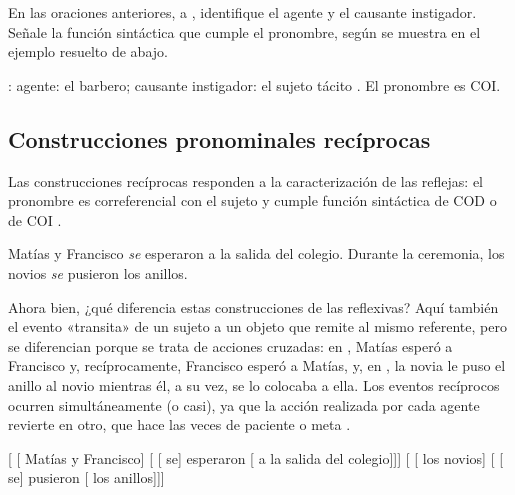 \begin{ejercicio}\label{ej:10-factitivas}
En las oraciones anteriores,  a ,
identifique el agente y el causante instigador. Señale la función sintáctica que
cumple el pronombre, según se muestra en el ejemplo resuelto de abajo.

\begin{resuelto}
: agente: el barbero; causante instigador: el sujeto
tácito . El pronombre  es COI.
\end{resuelto}
\end{ejercicio}

\subsection{Construcciones pronominales recíprocas}\label{sec:10-reciprocas}

Las construcciones recíprocas responden a la caracterización de las reflejas: el
pronombre es correferencial con el sujeto y cumple función sintáctica de COD
 o de COI .

\begin{exe}
  \ex\label{ex:10-matias} Matías y Francisco \textit{se} esperaron a la salida
      del colegio.
  \ex\label{ex:10-novios} Durante la ceremonia, los novios \textit{se} pusieron
      los anillos.
\end{exe}

Ahora bien, ¿qué diferencia estas construcciones de las reflexivas? Aquí también
el evento «transita» de un sujeto a un objeto que remite al mismo referente, pero
se diferencian porque se trata de acciones cruzadas: en ,
Matías esperó a Francisco y, recíprocamente, Francisco esperó a Matías, y, en
, la novia le puso el anillo al novio mientras él, a su vez,
se lo colocaba a ella. Los eventos recíprocos ocurren simultáneamente (o casi),
ya que la acción realizada por cada agente revierte en otro, que hace las veces
de paciente  o meta .

\begin{exe}
  \ex
    \begin{xlist}
      \ex\label{ex:10-recip-a} {}[ [ Matías y Francisco]
          [ [ se] esperaron
          [ a la salida del colegio]]]
      \ex\label{ex:10-recip-b} {}[ [ los novios]
          [ [ se] pusieron [
          los anillos]]]
    \end{xlist}
\end{exe}

